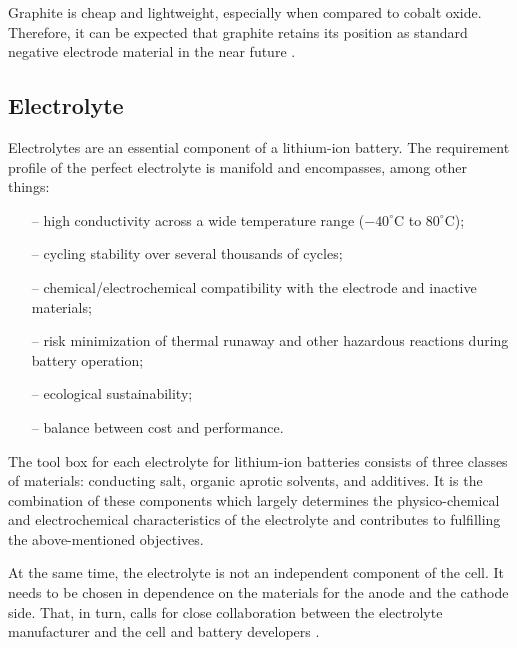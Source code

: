 Graphite is cheap and lightweight, especially when compared to cobalt oxide. Therefore, it can be expected that graphite retains its position as standard negative electrode material in the near future \cite{korthauer2018lithium}.

\subsection{Electrolyte}
\label{sec:electrolyte}
Electrolytes are an essential component of a lithium-ion battery. The requirement profile of the perfect electrolyte is manifold and encompasses, among other things:
\begin{itemize}
    \item[--] high conductivity across a wide temperature range ($-40^\circ$C to $80^\circ$C);
    \item[--] cycling stability over several thousands of cycles;
    \item[--] chemical/electrochemical compatibility with the electrode and inactive materials;
    \item[--] risk minimization of thermal runaway and other hazardous reactions during battery operation;
    \item[--] ecological sustainability;
    \item[--] balance between cost and performance.
\end{itemize}
The tool box for each electrolyte for lithium-ion batteries consists of three classes of materials: conducting salt, organic aprotic solvents, and additives. It is the combination of these components which largely determines the physico-chemical and electrochemical characteristics of the electrolyte and contributes to fulfilling the above-mentioned objectives. 

At the same time, the electrolyte is not an independent component of the cell. It needs to be chosen in dependence on the materials for the anode and the cathode side. That, in turn, calls for close collaboration between the electrolyte manufacturer and the cell and battery developers \cite{korthauer2018lithium}.

